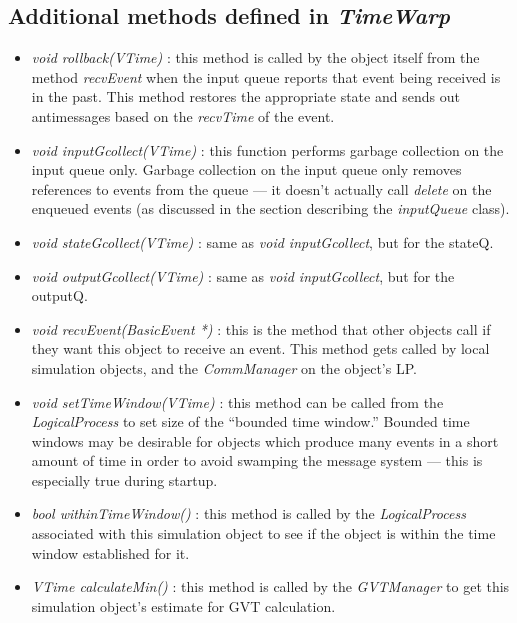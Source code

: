 \documentclass[11pt]{report}
\begin{document}
\subsection{Additional methods defined in {\it TimeWarp}}

\begin{itemize}
\item
{\it void rollback(VTime)} : this method is called by the object itself
from the method {\it recvEvent} when the input queue reports that event
being received is in the past.  This method restores the appropriate state
and sends out antimessages based on the {\it recvTime} of the event.

\item
{\it void inputGcollect(VTime)} : this function performs garbage collection
on the input queue only.  Garbage collection on the input queue only
removes references to events from the queue --- it doesn't actually call
{\it delete} on the enqueued events (as discussed in the section
describing the {\it inputQueue} class).

\item
{\it void stateGcollect(VTime)} : same as {\it void inputGcollect}, but
for the stateQ.

\item
{\it void outputGcollect(VTime)} : same as {\it void inputGcollect}, but
for the outputQ.

\item
{\it void recvEvent(BasicEvent *)} : this is the method that other objects
call if they want this object to receive an event.  This method gets
called by local simulation objects, and the {\it CommManager} on the
object's LP.

\item
{\it void setTimeWindow(VTime)} : this method can be called from the {\it
LogicalProcess} to set size of the ``bounded time window.''  Bounded time
windows may be desirable for objects which produce many events in a short
amount of time in order to avoid swamping the message system --- this is
especially true during startup.

\item
{\it bool withinTimeWindow()} : this method is called by the {\it
LogicalProcess} associated with this simulation object to see if the
object is within the time window established for it.

\item
{\it VTime calculateMin()} : this method is called by the {\it GVTManager}
to get this simulation object's estimate for GVT calculation.


\end{itemize}
\end{document}
